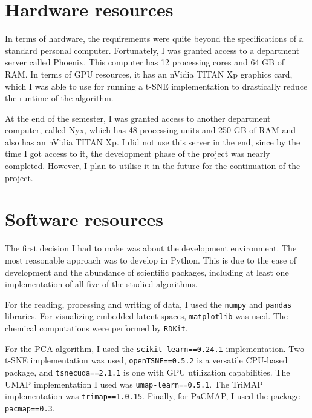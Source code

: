 \section{Hardware resources}\label{sec:hardware-resources}

In terms of hardware, the requirements were quite beyond the specifications of a standard personal computer. Fortunately, I was granted access to a department server called Phoenix. This computer has 12 processing cores and 64 GB of RAM. In terms of GPU resources, it has an nVidia TITAN Xp graphics card, which I was able to use for running a t-SNE implementation to drastically reduce the runtime of the algorithm.

At the end of the semester, I was granted access to another department computer, called Nyx, which has 48 processing units and 250 GB of RAM and also has an nVidia TITAN Xp. I did not use this server in the end, since by the time I got access to it, the development phase of the project was nearly completed. However, I plan to utilise it in the future for the continuation of the project.

\section{Software resources}\label{sec:software-resources}

The first decision I had to make was about the development environment. The most reasonable approach was to develop in Python. This is due to the ease of development and the abundance of scientific packages, including at least one implementation of all five of the studied algorithms.

For the reading, processing and writing of data, I used the \texttt{numpy} and \texttt{pandas} libraries. For visualizing embedded latent spaces, \texttt{matplotlib} was used. The chemical computations were performed by \texttt{RDKit}\cite{bib:rdkit}.

For the PCA algorithm, I used the \texttt{scikit-learn==0.24.1} implementation. Two t-SNE implementation was used, \texttt{openTSNE==0.5.2} is a versatile CPU-based package, and \texttt{tsnecuda==2.1.1} is one with GPU utilization capabilities. The UMAP implementation I used was \texttt{umap-learn==0.5.1}. The TriMAP implementation was \texttt{trimap==1.0.15}. Finally, for PaCMAP, I used the package \texttt{pacmap==0.3}.